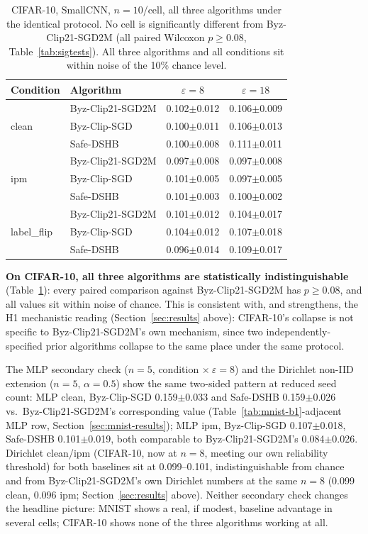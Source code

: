 \documentclass{article}
\begin{document}
\begin{table}[t]
\centering\small
\begin{tabular}{llcc}
\toprule
Condition & Algorithm & $\varepsilon{=}8$ & $\varepsilon{=}18$ \\
\midrule
\multirow{3}{*}{clean}
 & Byz-Clip21-SGD2M & 0.102$\pm$0.012 & 0.106$\pm$0.009 \\
 & Byz-Clip-SGD     & 0.100$\pm$0.011 & 0.106$\pm$0.013 \\
 & Safe-DSHB        & 0.100$\pm$0.008 & 0.111$\pm$0.011 \\
\multirow{3}{*}{ipm}
 & Byz-Clip21-SGD2M & 0.097$\pm$0.008 & 0.097$\pm$0.008 \\
 & Byz-Clip-SGD     & 0.101$\pm$0.005 & 0.097$\pm$0.005 \\
 & Safe-DSHB        & 0.101$\pm$0.003 & 0.100$\pm$0.002 \\
\multirow{3}{*}{label\_flip}
 & Byz-Clip21-SGD2M & 0.101$\pm$0.012 & 0.104$\pm$0.017 \\
 & Byz-Clip-SGD     & 0.104$\pm$0.012 & 0.107$\pm$0.018 \\
 & Safe-DSHB        & 0.096$\pm$0.014 & 0.109$\pm$0.017 \\
\bottomrule
\end{tabular}
\caption{CIFAR-10, SmallCNN, $n{=}10$/cell, all three algorithms under the
identical protocol. No cell is significantly different from Byz-Clip21-SGD2M
(all paired Wilcoxon $p\geq0.08$, Table~\ref{tab:sigtests}). All three
algorithms and all conditions sit within noise of the 10\% chance level.}
\label{tab:baseline-cifar}
\end{table}

\textbf{On CIFAR-10, all three algorithms are statistically indistinguishable}
(Table~\ref{tab:baseline-cifar}): every paired comparison against
Byz-Clip21-SGD2M has $p\geq0.08$, and all values sit within noise of chance.
This is consistent with, and strengthens, the H1 mechanistic reading
(Section~\ref{sec:results} above): CIFAR-10's collapse is not specific to
Byz-Clip21-SGD2M's own mechanism, since two independently-specified prior
algorithms collapse to the same place under the same protocol.

The MLP secondary check ($n{=}5$, condition $\times\ \varepsilon{=}8$) and the
Dirichlet non-IID extension ($n{=}5$, $\alpha{=}0.5$) show the same two-sided
pattern at reduced seed count: MLP clean, Byz-Clip-SGD 0.159$\pm$0.033 and
Safe-DSHB 0.159$\pm$0.026 vs.\ Byz-Clip21-SGD2M's corresponding value
(Table~\ref{tab:mnist-b1}-adjacent MLP row, Section~\ref{sec:mnist-results});
MLP ipm, Byz-Clip-SGD 0.107$\pm$0.018, Safe-DSHB 0.101$\pm$0.019, both
comparable to Byz-Clip21-SGD2M's 0.084$\pm$0.026. Dirichlet clean/ipm
(CIFAR-10, now at $n{=}8$, meeting our own reliability threshold) for both
baselines sit at 0.099--0.101, indistinguishable from chance and from
Byz-Clip21-SGD2M's own Dirichlet numbers at the same $n{=}8$ (0.099 clean,
0.096 ipm; Section~\ref{sec:results} above). Neither secondary check changes the
headline picture: MNIST shows a real, if modest, baseline advantage in
several cells; CIFAR-10 shows none of the three algorithms working at all.
\end{document}

